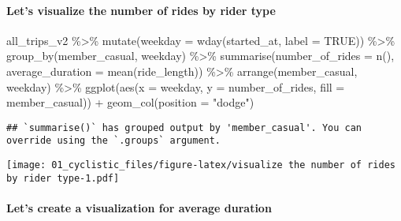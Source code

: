 \documentclass[
]{article}
\newenvironment{Shaded}{\begin{snugshade}}{\end{snugshade}}
\newcommand{\AttributeTok}[1]{\textcolor[rgb]{0.77,0.63,0.00}{#1}}
\newcommand{\ConstantTok}[1]{\textcolor[rgb]{0.00,0.00,0.00}{#1}}
\newcommand{\FunctionTok}[1]{\textcolor[rgb]{0.00,0.00,0.00}{#1}}
\newcommand{\NormalTok}[1]{#1}
\newcommand{\SpecialCharTok}[1]{\textcolor[rgb]{0.00,0.00,0.00}{#1}}
\newcommand{\StringTok}[1]{\textcolor[rgb]{0.31,0.60,0.02}{#1}}
\begin{document}
\hypertarget{lets-visualize-the-number-of-rides-by-rider-type}{%
\paragraph{Let's visualize the number of rides by rider
type}\label{lets-visualize-the-number-of-rides-by-rider-type}}

\begin{Shaded}
\begin{Highlighting}[]
\NormalTok{all\_trips\_v2 }\SpecialCharTok{\%\textgreater{}\%} 
  \FunctionTok{mutate}\NormalTok{(}\AttributeTok{weekday =} \FunctionTok{wday}\NormalTok{(started\_at, }\AttributeTok{label =} \ConstantTok{TRUE}\NormalTok{)) }\SpecialCharTok{\%\textgreater{}\%} 
  \FunctionTok{group\_by}\NormalTok{(member\_casual, weekday) }\SpecialCharTok{\%\textgreater{}\%} 
  \FunctionTok{summarise}\NormalTok{(}\AttributeTok{number\_of\_rides =} \FunctionTok{n}\NormalTok{(), }
            \AttributeTok{average\_duration =} \FunctionTok{mean}\NormalTok{(ride\_length)) }\SpecialCharTok{\%\textgreater{}\%} 
  \FunctionTok{arrange}\NormalTok{(member\_casual, weekday)  }\SpecialCharTok{\%\textgreater{}\%} 
  \FunctionTok{ggplot}\NormalTok{(}\FunctionTok{aes}\NormalTok{(}\AttributeTok{x =}\NormalTok{ weekday, }\AttributeTok{y =}\NormalTok{ number\_of\_rides, }
             \AttributeTok{fill =}\NormalTok{ member\_casual)) }\SpecialCharTok{+}
  \FunctionTok{geom\_col}\NormalTok{(}\AttributeTok{position =} \StringTok{"dodge"}\NormalTok{)}
\end{Highlighting}
\end{Shaded}

\begin{verbatim}
## `summarise()` has grouped output by 'member_casual'. You can override using the `.groups` argument.
\end{verbatim}

\texttt{[image: 01\_cyclistic\_files/figure-latex/visualize the number of rides by rider type-1.pdf]}

\hypertarget{lets-create-a-visualization-for-average-duration}{%
\paragraph{Let's create a visualization for average
duration}\label{lets-create-a-visualization-for-average-duration}}
\end{document}
